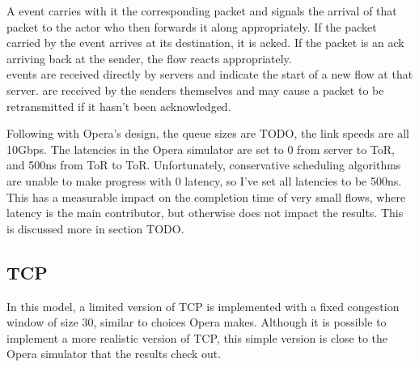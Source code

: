 A  event carries with it the corresponding packet and signals the arrival of that packet to the actor who then forwards it along appropriately.
If the packet carried by the event arrives at its destination, it is acked.
If the packet is an ack arriving back at the sender, the flow reacts appropriately.\\
 events are received directly by servers and indicate the start of a new flow at that server.
 are received by the senders themselves and may cause a packet to be retransmitted if it hasn't been acknowledged.

Following with Opera's design, the queue sizes are TODO, the link speeds are all 10Gbps.
The latencies in the Opera simulator are set to 0 from server to ToR, and 500ns from ToR to ToR.
Unfortunately, conservative scheduling algorithms are unable to make progress with 0 latency, so I've set all latencies to be 500ns.
This has a measurable impact on the completion time of very small flows, where latency is the main contributor, but otherwise does not impact the results.
This is discussed more in section TODO.


\subsection{TCP} \label{model-tcp}

In this model, a limited version of TCP is implemented with a fixed congestion window of size 30, similar to choices Opera makes.
Although it is possible to implement a more realistic version of TCP, this simple version is close to the Opera simulator that the results check out.
